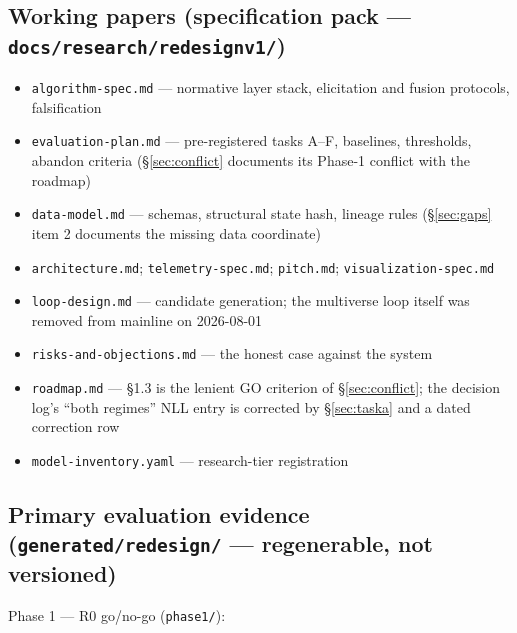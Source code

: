 \documentclass[11pt]{article}
\begin{document}
\subsection{Working papers (specification pack --- \texttt{docs/research/redesignv1/})}

\begin{itemize}[leftmargin=1.4em,itemsep=1pt]
\item \texttt{algorithm-spec.md} --- normative layer stack, elicitation and
  fusion protocols, falsification
\item \texttt{evaluation-plan.md} --- pre-registered tasks A--F, baselines,
  thresholds, abandon criteria (\S\ref{sec:conflict} documents its Phase-1
  conflict with the roadmap)
\item \texttt{data-model.md} --- schemas, structural state hash, lineage
  rules (\S\ref{sec:gaps} item 2 documents the missing data coordinate)
\item \texttt{architecture.md}; \texttt{telemetry-spec.md};
  \texttt{pitch.md}; \texttt{visualization-spec.md}
\item \texttt{loop-design.md} --- candidate generation; the multiverse loop
  itself was removed from mainline on 2026-08-01
\item \texttt{risks-and-objections.md} --- the honest case against the
  system
\item \texttt{roadmap.md} --- \S1.3 is the lenient GO criterion of
  \S\ref{sec:conflict}; the decision log's ``both regimes'' NLL entry is
  corrected by \S\ref{sec:taska} and a dated correction row
\item \texttt{model-inventory.yaml} --- research-tier registration
\end{itemize}

\subsection{Primary evaluation evidence (\texttt{generated/redesign/} --- regenerable, not versioned)}

Phase 1 --- R0 go/no-go (\texttt{phase1/}):
\end{document}
